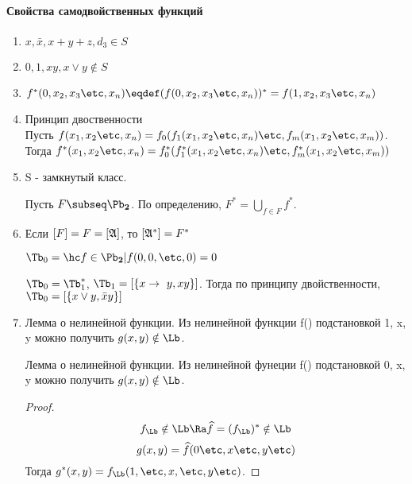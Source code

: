 \documentclass[unicode,10pt]{article}
\begin{document}
\paragraph{Свойства самодвойственных функций}
\begin{enumerate}
  \item $x,\bar x, x+y+z,d_3 \in S$
  \item $0,1,xy,x\vee y \notin S$
  \item $f^*(0,\setf[x]{n})\eqdef (f(0,\setf[x]{n}))^*=f(1,\setf[x]{n}) $
  \item Принцип двоственности \\
    Пусть $f(\set[x]{n}) = f_0(f_1(\set[x]{n})\etc,f_m(\set[x]{m}))$.\\
    Тогда  $f^*(\set[x]{n}) = f_0^*(f_1^*(\set[x]{n})\etc,f_m^*(\set[x]{m}))$
   \item S - замкнутый класс.
     \begin{df}
       Пусть $F\subseq\PD$. По определению, $F^* = \bigcup\limits_{f\in F}{f^*}$.
     \end{df}
   \item Если $[F] = F= [\mathfrak{A}]$, то $[\mathfrak{A}^*]= F^*$
     \begin{ex}
       \begin{df}
         $\Tb_0=\setof{f\in\PD}{f(0,0,\etc,0)} = 0$
       \end{df}
       $\Tb_0= \Tb_1^*$, $\Tb_1=\cls{\impl,xy}$. Тогда по принципу двойственности,
       $\Tb_0=\cls{x\vee y, \bar xy}$%
     \end{ex}
     \item
       \begin{lemma}{Лемма о нелинейной функции.}
       Из нелинейной функции f() подстановкой 1, x, y можно
       получить $g(x,y) \notin\Lb$.
       \end{lemma}
       \begin{lemma}{Лемма о нелинейной функции.}
         Из нелинейной фунеции f() подстановкой 0, x, y можно
         получить $g(x,y) \notin\Lb$.
       \end{lemma}
       \begin{proof}
         $$ \fL\notin\Lb \Ra \widehat f = (\fL)^*\notin \Lb$$
         $$ g(x,y) = \widehat f(0\etc,x\etc,y\etc)$$
         Тогда $\displaystyle g^*(x,y) = \fL(1,\etc,x,\etc,y\etc)$.
       \end{proof}
\end{enumerate}
\end{document}
